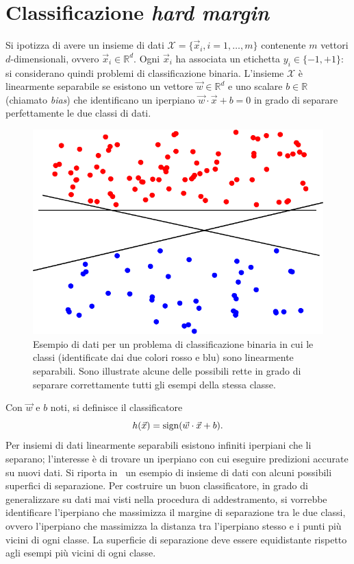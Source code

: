 \section{Classificazione \emph{hard margin}}\label{sec:hard_margin_classifier}
Si ipotizza di avere un insieme di dati $\mathcal{X} = \{\Vec{x}_i, i=1,\dots,m\}$ contenente $m$ vettori $d$-dimensionali, ovvero $\Vec{x}_i \in \mathbb{R}^d$. 
Ogni $\Vec{x}_i$ ha associata un etichetta $y_i \in \{-1, +1\}$: si considerano quindi problemi di classificazione binaria.
%
L'insieme $\mathcal{X}$ è linearmente separabile se esistono un vettore $\Vec{w} \in \mathbb{R}^d$ e uno scalare $b \in \mathbb{R}$ (chiamato \emph{bias}) che identificano un iperpiano $\Vec{w}\cdot \Vec{x} +b=0$ in grado di separare perfettamente le due classi di dati.
\begin{figure}
    \centering
    \includegraphics[width=0.5\linewidth]{img/dati_linearmente_separabili.pdf}
    \caption{Esempio di dati per un problema di classificazione binaria in cui le classi (identificate dai due colori rosso e blu) sono linearmente separabili. Sono illustrate alcune delle possibili rette in grado di separare correttamente tutti gli esempi della stessa classe. }
    \label{fig:dati_linearmente_separabili}
\end{figure}
Con $\Vec{w}$ e $b$ noti, si definisce il classificatore 
\begin{equation*}
    h(\Vec{x}) = \mathrm{sign}(\Vec{w}\cdot \Vec{x} +b).
\end{equation*} 
Per insiemi di dati linearmente separabili esistono infiniti iperpiani che li separano; l'interesse è di trovare un iperpiano con cui eseguire predizioni accurate su nuovi dati. 
Si riporta in~ un esempio di insieme di dati con alcuni possibili superfici di separazione. 
Per costruire un buon classificatore, in grado di generalizzare su dati mai visti nella procedura di addestramento, si vorrebbe identificare l'iperpiano che massimizza il margine di separazione tra le due classi, ovvero l'iperpiano che massimizza la distanza tra l'iperpiano stesso e i punti più vicini di ogni classe.
La superficie di separazione deve essere equidistante rispetto agli esempi più vicini di ogni classe.

